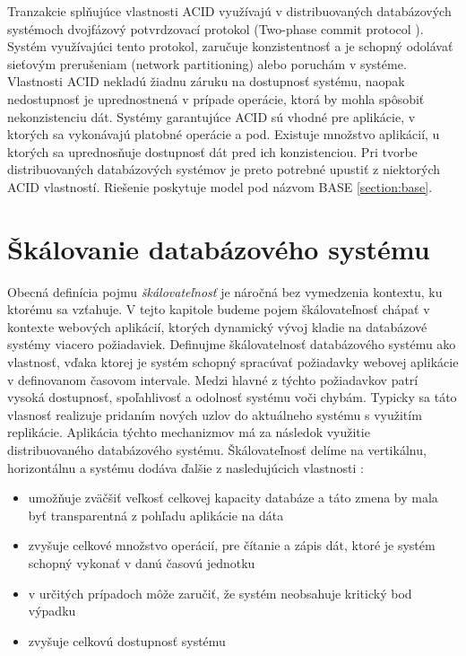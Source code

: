 \documentclass[11pt,twoside,a4paper]{book}
\begin{document}
Tranzakcie splňujúce vlastnosti ACID využívajú v distribuovaných databázových systémoch dvojfázový potvrdzovací protokol (Two-phase commit protocol \cite{bernstein1987concurrency}). Systém využívajúci tento protokol, zaručuje konzistentnosť a je schopný odolávať sieťovým prerušeniam (network partitioning) alebo poruchám v systéme. Vlastnosti ACID nekladú žiadnu záruku na dostupnosť systému, naopak nedostupnosť je uprednostnená v prípade operácie, ktorá by mohla spôsobiť nekonzistenciu dát. Systémy garantujúce ACID sú vhodné pre aplikácie, v ktorých sa vykonávajú platobné operácie a pod. Existuje množstvo aplikácií, u ktorých sa uprednosňuje dostupnosť dát pred ich konzistenciou. Pri tvorbe distribuovaných databázových systémov je preto potrebné upustiť z niektorých ACID vlastností. Riešenie poskytuje model pod názvom BASE \ref{section:base}.


\section{Škálovanie databázového systému} %
Obecná definícia pojmu \emph{škálovateľnosť} \cite{bondi2000characteristics} je náročná  bez vymedzenia kontextu, ku ktorému sa vzťahuje. V tejto kapitole budeme pojem škálovateľnosť chápať v kontexte webových aplikácií, ktorých dynamický vývoj kladie na databázové systémy viacero požiadaviek. Definujme škálovatelnosť databázového systému ako vlastnosť, vďaka ktorej je systém schopný spracúvať požiadavky webovej aplikácie v definovanom časovom intervale. Medzi hlavné z týchto požiadavkov patrí vysoká dostupnosť, spoľahlivosť a odolnosť systému voči chybám. Typicky sa táto vlasnosť realizuje pridaním nových uzlov do aktuálneho systému s využitím replikácie. Aplikácia týchto mechanizmov má za následok využitie distribuovaného databázového systému. Škálovateľnosť delíme na vertikálnu, horizontálnu a systému dodáva ďalšie z nasledujúcich vlastnosti \cite{hewitt2010cassandra}:
\begin{itemize}
 \item umožňuje zväčšiť veľkosť celkovej kapacity databáze a táto zmena by mala byť transparentná z pohľadu aplikácie na dáta
  \item zvyšuje celkové množstvo operácií, pre čítanie a zápis dát, ktoré je systém schopný vykonať v danú časovú jednotku
  \item v určitých prípadoch môže zaručiť, že systém neobsahuje kritický bod výpadku
  \item zvyšuje celkovú dostupnosť systému
\end{itemize}
\end{document}
